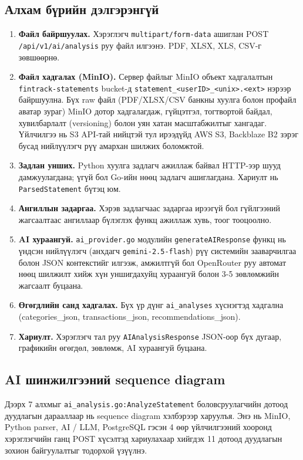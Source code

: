 \subsection{Алхам бүрийн дэлгэрэнгүй}
\begin{enumerate}
    \item \textbf{Файл байршуулах.} Хэрэглэгч \texttt{multipart/form-data} ашиглан POST \texttt{/api/v1/ai/analysis} руу файл илгээнэ. PDF, XLSX, XLS, CSV-г зөвшөөрнө.
    \item \textbf{Файл хадгалах (MinIO).} Сервер файлыг MinIO объект хадгалалтын \texttt{fintrack-statements} bucket-д \texttt{statement\_<userID>\_<unix>.<ext>} нэрээр байршуулна. Бүх raw файл (PDF/XLSX/CSV банкны хуулга болон профайл аватар зураг) MinIO дотор хадгалагдаж, гүйцэтгэл, тогтвортой байдал, хувилбарлалт (versioning) болон уян хатан масштабжилтыг хангадаг. Үйлчилгээ нь S3 API-тай нийцтэй тул ирээдүйд AWS S3, Backblaze B2 зэрэг бусад нийлүүлэгч рүү амархан шилжих боломжтой.
    \item \textbf{Задлан унших.} Python хуулга задлагч ажиллаж байвал HTTP-ээр шууд дамжуулагдана; үгүй бол Go-ийн нөөц задлагч ашиглагдана. Хариулт нь \texttt{ParsedStatement} бүтэц юм.
    \item \textbf{Ангиллын задаргаа.} Хэрэв задлагчаас задаргаа ирээгүй бол гүйлгээний жагсаалтаас ангиллаар бүлэглэх функц ажиллаж хувь, тоог тооцоолно.
    \item \textbf{AI хураангуй.} \texttt{ai\_provider.go} модулийн \texttt{generateAIResponse} функц нь үндсэн нийлүүлэгч (анхдагч \texttt{gemini-2.5-flash}) рүү системийн зааварчилгаа болон JSON контекстийг илгээж, амжилтгүй бол OpenRouter руу автомат нөөц шилжилт хийж хүн уншигдахуйц хураангуй болон 3-5 зөвлөмжийн жагсаалт буцаана.
    \item \textbf{Өгөгдлийн санд хадгалах.} Бүх үр дүнг \texttt{ai\_analyses} хүснэгтэд хадгална (categories\_json, transactions\_json, recommendations\_json).
    \item \textbf{Хариулт.} Хэрэглэгч тал руу \texttt{AIAnalysisResponse} JSON-оор бүх дугаар, графикийн өгөгдөл, зөвлөмж, AI хураангуй буцаана.
\end{enumerate}

\subsection{AI шинжилгээний sequence diagram}
Дээрх 7 алхмыг \texttt{ai\_analysis.go:AnalyzeStatement} боловсруулагчийн дотоод дуудлагын дарааллаар нь sequence diagram хэлбэрээр харуулъя. Энэ нь MinIO, Python parser, AI / LLM, PostgreSQL гэсэн 4 өөр үйлчилгээний хооронд хэрэглэгчийн ганц POST хүсэлтэд хариулахаар хийгдэх 11 дотоод дуудлагын зохион байгуулалтыг тодорхой үзүүлнэ.

